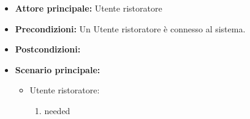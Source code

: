 \label{usecase:Prenotazioni lista}
\begin{itemize}
\item \textbf{Attore principale:} Utente ristoratore
\item \textbf{Precondizioni:}
Un Utente ristoratore è connesso al sistema.
\item \textbf{Postcondizioni:}
\item \textbf{Scenario principale:}
\begin{itemize}
\item Utente ristoratore:
\begin{enumerate}
\item needed
\end{enumerate}
\end{itemize}

\end{itemize}